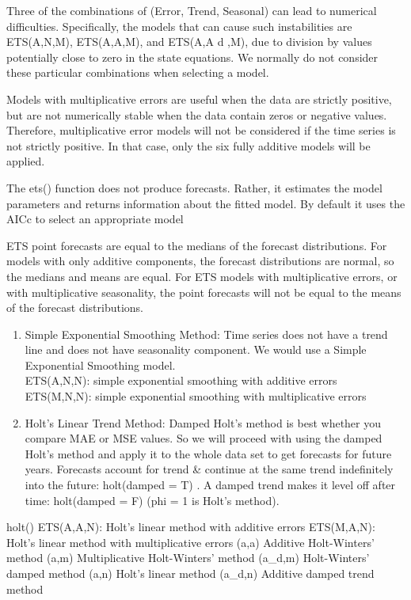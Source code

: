\documentclass[]{book}
\begin{document}
Three of the combinations of (Error, Trend, Seasonal) can lead to
numerical difficulties. Specifically, the models that can cause such
instabilities are ETS(A,N,M), ETS(A,A,M), and ETS(A,A d ,M), due to
division by values potentially close to zero in the state equations. We
normally do not consider these particular combinations when selecting a
model.

Models with multiplicative errors are useful when the data are strictly
positive, but are not numerically stable when the data contain zeros or
negative values. Therefore, multiplicative error models will not be
considered if the time series is not strictly positive. In that case,
only the six fully additive models will be applied.

The ets() function does not produce forecasts. Rather, it estimates the
model parameters and returns information about the fitted model. By
default it uses the AICc to select an appropriate model

ETS point forecasts are equal to the medians of the forecast
distributions. For models with only additive components, the forecast
distributions are normal, so the medians and means are equal. For ETS
models with multiplicative errors, or with multiplicative seasonality,
the point forecasts will not be equal to the means of the forecast
distributions.

\begin{enumerate}
\def\labelenumi{\arabic{enumi}.}
\item
  Simple Exponential Smoothing Method: Time series does not have a trend
  line and does not have seasonality component. We would use a Simple
  Exponential Smoothing model.\\
  ETS(A,N,N): simple exponential smoothing with additive errors
  \textbar{} ETS(M,N,N): simple exponential smoothing with
  multiplicative errors
\item
  Holt's Linear Trend Method: Damped Holt's method is best whether you
  compare MAE or MSE values. So we will proceed with using the damped
  Holt's method and apply it to the whole data set to get forecasts for
  future years. Forecasts account for trend \& continue at the same
  trend indefinitely into the future: holt(damped = T) . A damped trend
  makes it level off after time: holt(damped = F) (phi = 1 is Holt's
  method).
\end{enumerate}

holt() \textbar{} ETS(A,A,N): Holt's linear method with additive errors
\textbar{} ETS(M,A,N): Holt's linear method with multiplicative errors
\textbar{} (a,a) Additive Holt-Winters' method \textbar{} (a,m)
Multiplicative Holt-Winters' method \textbar{} (a\_d,m) Holt-Winters'
damped method \textbar{} (a,n) Holt's linear method \textbar{} (a\_d,n)
Additive damped trend method
\end{document}
